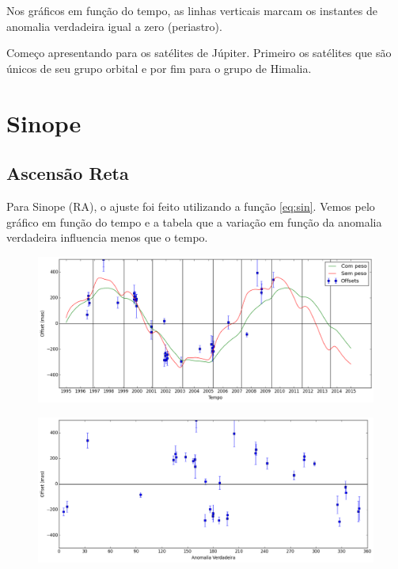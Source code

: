 \documentclass[11pt,a4paper]{report}
\begin{document}
Nos gráficos em função do tempo, as linhas verticais marcam os instantes de anomalia verdadeira igual a zero (periastro).

Começo apresentando para os satélites de Júpiter. Primeiro os satélites que são únicos de seu grupo orbital e por fim para o grupo de Himalia.


\chapter*{Sinope}
\section*{Ascensão Reta}

\indent \indent Para Sinope (RA), o ajuste foi feito utilizando a função \ref{eq:sin}. Vemos pelo gráfico em função do tempo e a tabela que a variação em função da anomalia verdadeira influencia menos que o tempo.\\

\begin{figure}[h]
\includegraphics[scale=0.45]{Sinope/RA.png} 
\end{figure}

\begin{figure}[h]
\includegraphics[scale=0.45]{Sinope/RA_anom.png}  
\end{figure}
\end{document}
